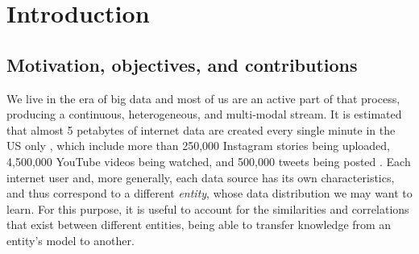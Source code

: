 
\chapter{Introduction}


\label{chp:intro}


\section{Motivation, objectives, and contributions}

We live in the era of big data and most of us are an active part of that process, producing a continuous, heterogeneous, and multi-modal stream. It is estimated that almost 5 petabytes of internet data are created every single minute in the US only \cite{Forbes}, which include more than 250,000 Instagram stories being uploaded, 4,500,000 YouTube videos being watched, and 500,000 tweets being posted \cite{DOMO}. Each internet user and, more generally, each data source has its own characteristics, and thus correspond to a different \emph{entity}, whose data distribution we may want to learn. For this purpose, it is useful to account for the similarities and correlations that exist between different entities, being able to transfer knowledge from an entity's model to another.

